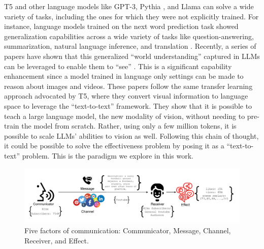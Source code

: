 T5 and other language models like GPT-3, Pythia \citep{biderman2023pythia}, and Llama \citep{touvron2023llama} can solve a wide variety of tasks, including the ones for which they were not explicitly trained. For instance, language models trained on the next word prediction task showed generalization capabilities across a wide variety of tasks like question-answering, summarization, natural language inference, and translation \citep{brown2020language}. Recently, a series of papers have shown that this generalized ``world understanding'' captured in LLMs can be leveraged to enable them to ``see'' \citep{liu2023visual,li2023videochat,li2023blip2,zhu2023minigpt,ge2023planting,zhang2023video,bhattacharya2023video}. This is a significant capability enhancement since a model trained in language only settings can be made to reason about images and videos. These papers follow the same transfer learning approach advocated by T5, where they convert visual information to language space to leverage the ``text-to-text'' framework. They show that it is possible to teach a large language model, the new modality of vision, without needing to pre-train the model from scratch. Rather, using only a few million tokens, it is possible to scale LLMs' abilities to vision as well. Following this chain of thought, it could be possible to solve the effectiveness problem by posing it as a ``text-to-text'' problem. This is the paradigm we explore in this work. 


\begin{figure}[!t]
    \centering
    \includegraphics[width=\textwidth]{images/content-behavior-five-factors.pdf}
    \caption{Five factors of communication: Communicator, Message, Channel, Receiver, and Effect.}
    \label{fig:five-factors-communication}
\end{figure}


